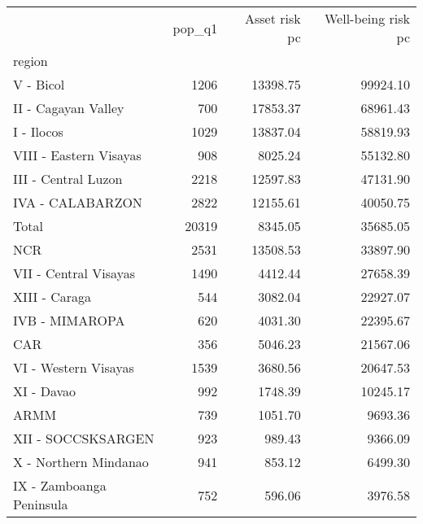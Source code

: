 \begin{tabular}{lrrr}
\toprule
{} &  pop\_q1 &  Asset risk pc &  Well-being risk pc \\
region                   &         &                &                     \\
\midrule
V - Bicol                &    1206 &       13398.75 &            99924.10 \\
II - Cagayan Valley      &     700 &       17853.37 &            68961.43 \\
I - Ilocos               &    1029 &       13837.04 &            58819.93 \\
VIII - Eastern Visayas   &     908 &        8025.24 &            55132.80 \\
III - Central Luzon      &    2218 &       12597.83 &            47131.90 \\
IVA - CALABARZON         &    2822 &       12155.61 &            40050.75 \\
Total                    &   20319 &        8345.05 &            35685.05 \\
NCR                      &    2531 &       13508.53 &            33897.90 \\
VII - Central Visayas    &    1490 &        4412.44 &            27658.39 \\
XIII - Caraga            &     544 &        3082.04 &            22927.07 \\
IVB - MIMAROPA           &     620 &        4031.30 &            22395.67 \\
CAR                      &     356 &        5046.23 &            21567.06 \\
VI - Western Visayas     &    1539 &        3680.56 &            20647.53 \\
XI - Davao               &     992 &        1748.39 &            10245.17 \\
ARMM                     &     739 &        1051.70 &             9693.36 \\
XII - SOCCSKSARGEN       &     923 &         989.43 &             9366.09 \\
X - Northern Mindanao    &     941 &         853.12 &             6499.30 \\
IX - Zamboanga Peninsula &     752 &         596.06 &             3976.58 \\
\bottomrule
\end{tabular}
